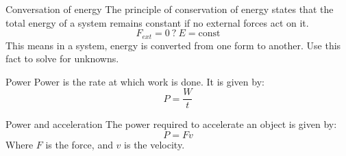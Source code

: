 \begin{theorem}
    {Conversation of energy}
    The principle of conservation of energy states that the total energy of a system remains constant if no external forces act on it.
    \[F_{ext}=0\ ?\ E=\text{const}\]
    This means in a system, energy is converted from one form to another. Use this fact to solve for unknowns.
\end{theorem}

\begin{definition}
    {Power}
    Power is the rate at which work is done. It is given by:
    \[P=\frac{W}{t}\]
\end{definition}

\begin{theorem}
    {Power and acceleration}
    The power required to accelerate an object is given by:
    \[P=Fv\]
    Where $F$ is the force, and $v$ is the velocity.
\end{theorem}
